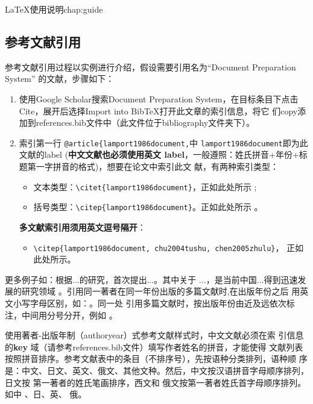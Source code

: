 \begin{cuzchapter}{\LaTeX{}使用说明}{chap:guide}
    \subsection{参考文献引用}\label{sub:references}

    参考文献引用过程以实例进行介绍，假设需要引用名为``Document Preparation System''
    的文献，步骤如下：
    \begin{enumerate}
        \item 使用Google Scholar搜索Document Preparation System，在目标条目下点击
              Cite，展开后选择Import into BibTeX打开此文章的索引信息，将它
              们copy添加到references.bib文件中（此文件位于bibliography文件夹下）。
        \item 索引第一行 \verb|@article{lamport1986document,|中
              \verb|lamport1986document|即为此文献的label (\textbf{中文文献也必须使用英文
                  label}，一般遵照：姓氏拼音+年份+标题第一字拼音的格式)，想要在论文中索引此文
              献，有两种索引类型：
              \begin{itemize}
                  \item 文本类型：\verb|\citet{lamport1986document}|，正如此处所示
                        \citet{lamport1986document};
                  \item 括号类型：\verb|\citep{lamport1986document}|。正如此处所示
                        \citep{lamport1986document}。
              \end{itemize}
              \textbf{多文献索引用须用英文逗号隔开}：
              \begin{itemize}
                  \item \verb|\citep{lamport1986document, chu2004tushu, chen2005zhulu}|，
                        正如此处所示\citep{lamport1986document, chu2004tushu, chen2005zhulu}。
              \end{itemize}
    \end{enumerate}

    更多例子如：\citet{walls2013drought}根据...的研究，首次提出...。其中关于
    ...\citep{walls2013drought}，是当前中国...得到迅速发展的研究领域
    \citep{chen1980zhongguo}。引用同一著者在同一年份出版的多篇文献时,在出版年份之后
    用英文小写字母区别，如：\citep{yuan2012lana, yuan2012lanb, yuan2012lanc}。同一处
    引用多篇文献时，按出版年份由近及远依次标注，中间用分号分开，例如
    \citep{chen1980zhongguo, stamerjohanns2009mathml, hls2012jinji, niu2013zonghe}。

    使用著者-出版年制（authoryear）式参考文献样式时，中文文献必须在索
    引信息的\textbf{key} 域（请参考references.bib文件）填写作者姓名的拼音，才能使得
    文献列表按照拼音排序。参考文献表中的条目（不排序号），先按语种分类排列，语种顺
    序是：中文、日文、英文、俄文、其他文种。然后，中文按汉语拼音字母顺序排列，日文按
    第一著者的姓氏笔画排序，西文和 俄文按第一著者姓氏首字母顺序排列。如中
    \citep{niu2013zonghe}、日\citep{Bohan1928}、英\citep{stamerjohanns2009mathml}、
    俄\citep{Dubrovin1906}。


\end{cuzchapter}
